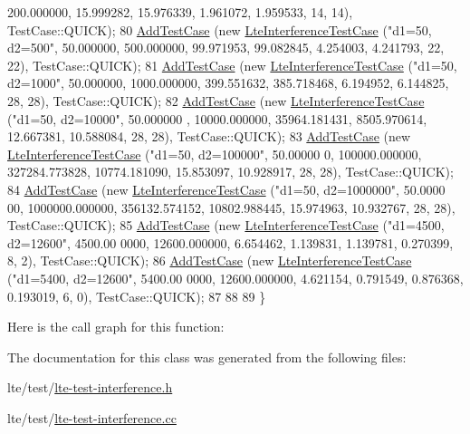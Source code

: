 \begin{DoxyCode}
      200.000000,  15.999282, 15.976339,  1.961072, 1.959533, 14, 14), TestCase::QUICK);
80   \hyperlink{classns3_1_1TestCase_a3718088e3eefd5d6454569d2e0ddd835}{AddTestCase} (\textcolor{keyword}{new} \hyperlink{classLteInterferenceTestCase}{LteInterferenceTestCase} (\textcolor{stringliteral}{"d1=50, d2=500"},  50.000000, 
      500.000000,  99.971953, 99.082845,  4.254003, 4.241793, 22, 22), TestCase::QUICK);
81   \hyperlink{classns3_1_1TestCase_a3718088e3eefd5d6454569d2e0ddd835}{AddTestCase} (\textcolor{keyword}{new} \hyperlink{classLteInterferenceTestCase}{LteInterferenceTestCase} (\textcolor{stringliteral}{"d1=50, d2=1000"},  50.000000,
       1000.000000,  399.551632, 385.718468,  6.194952, 6.144825, 28, 28), TestCase::QUICK);
82   \hyperlink{classns3_1_1TestCase_a3718088e3eefd5d6454569d2e0ddd835}{AddTestCase} (\textcolor{keyword}{new} \hyperlink{classLteInterferenceTestCase}{LteInterferenceTestCase} (\textcolor{stringliteral}{"d1=50, d2=10000"},  50.000000
      , 10000.000000,  35964.181431, 8505.970614,  12.667381, 10.588084, 28, 28), TestCase::QUICK);
83   \hyperlink{classns3_1_1TestCase_a3718088e3eefd5d6454569d2e0ddd835}{AddTestCase} (\textcolor{keyword}{new} \hyperlink{classLteInterferenceTestCase}{LteInterferenceTestCase} (\textcolor{stringliteral}{"d1=50, d2=100000"},  50.00000
      0, 100000.000000,  327284.773828, 10774.181090,  15.853097, 10.928917, 28, 28), TestCase::QUICK);
84   \hyperlink{classns3_1_1TestCase_a3718088e3eefd5d6454569d2e0ddd835}{AddTestCase} (\textcolor{keyword}{new} \hyperlink{classLteInterferenceTestCase}{LteInterferenceTestCase} (\textcolor{stringliteral}{"d1=50, d2=1000000"},  50.0000
      00, 1000000.000000,  356132.574152, 10802.988445,  15.974963, 10.932767, 28, 28), TestCase::QUICK);
85   \hyperlink{classns3_1_1TestCase_a3718088e3eefd5d6454569d2e0ddd835}{AddTestCase} (\textcolor{keyword}{new} \hyperlink{classLteInterferenceTestCase}{LteInterferenceTestCase} (\textcolor{stringliteral}{"d1=4500, d2=12600"},  4500.00
      0000, 12600.000000,  6.654462, 1.139831,  1.139781, 0.270399, 8, 2), TestCase::QUICK);
86   \hyperlink{classns3_1_1TestCase_a3718088e3eefd5d6454569d2e0ddd835}{AddTestCase} (\textcolor{keyword}{new} \hyperlink{classLteInterferenceTestCase}{LteInterferenceTestCase} (\textcolor{stringliteral}{"d1=5400, d2=12600"},  5400.00
      0000, 12600.000000,  4.621154, 0.791549,  0.876368, 0.193019, 6, 0), TestCase::QUICK);
87 
88 
89 \}
\end{DoxyCode}


Here is the call graph for this function\+:




The documentation for this class was generated from the following files\+:\begin{DoxyCompactItemize}
\item 
lte/test/\hyperlink{lte-test-interference_8h}{lte-\/test-\/interference.\+h}\item 
lte/test/\hyperlink{lte-test-interference_8cc}{lte-\/test-\/interference.\+cc}\end{DoxyCompactItemize}
